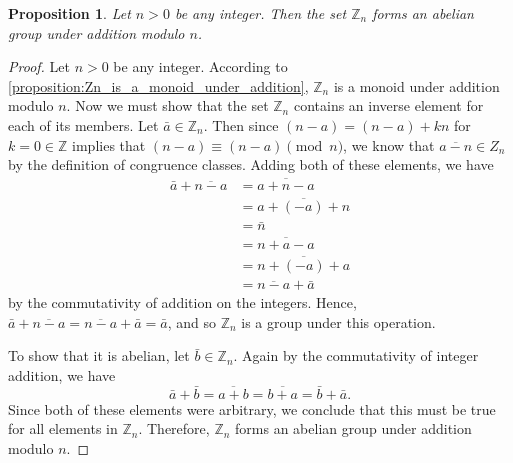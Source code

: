 \documentclass[12pt, titlepage]{amsart}
\newcommand\Z{{\mathbb Z}}
\newtheorem{theorem}{Theorem}[subsection]
\newtheorem{prop}{Proposition}[subsection]
\theoremstyle{definition}
\newtheorem{definition}{Definition}[subsection]
\begin{document}

	
	\begin{prop}\label{proposition:Zn_is_an_abelian_group_under_addition}
		Let $n>0$ be any integer. Then the set $\Z_n$ forms an abelian group under addition modulo $n$.
	\end{prop}
	
	\begin{proof}
		Let $n>0$ be any integer.
		According to \cref{proposition:Zn_is_a_monoid_under_addition}, $\Z_n$ is a monoid under addition modulo $n$.
		Now we must show that the set $\Z_n$ contains an inverse element for each of its members.
		Let $\bar{a} \in \Z_n$.
		Then since $(n-a) = (n-a) + kn$ for $k = 0 \in \Z$ implies that $(n-a) \equiv (n-a) \pmod n$, we know that $\overline{a - n} \in Z_n$ by the definition of congruence classes.
		Adding both of these elements, we have 
		\begin{align*}
			\bar{a} + \overline{n-a} 
			&= \overline{a + n - a} \\
			&= \overline{a + (-a) + n} \\ 
			&= \bar{n} \\
			&= \overline{n + a - a} \\
			&= \overline{n + (-a) + a} \\
			&= \overline{n-a} + \bar{a}
		\end{align*}
		by the commutativity of addition on the integers.
		Hence, $\bar{a} + \overline{n-a} = \overline{n-a} + \bar{a} = \bar{a}$, and so $\Z_n$ is a group under this operation.
		
		To show that it is abelian, let $\bar{b} \in \Z_n$.
		Again by the commutativity of integer addition, we have 
		$$\bar{a}+\bar{b} = \overline{a + b} = \overline{b + a} = \bar{b} + \bar{a}.$$
		Since both of these elements were arbitrary, we conclude that this must be true for all elements in $\Z_n$.
		Therefore, $\Z_n$ forms an abelian group under addition modulo $n$.	
	\end{proof}
	
\end{document}
